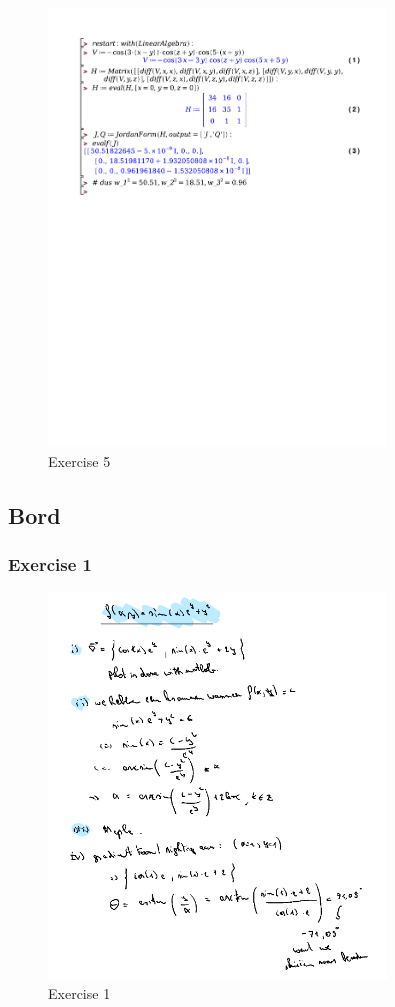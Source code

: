 \documentclass[a4paper]{report}
\begin{document}
\begin{figure}[H]
	\centering
	\includegraphics[width=0.8\textwidth]{exercises/huis_4_ex_5.pdf}
	\caption{Exercise 5}
	\label{fig:huis_4_ex_5}
\end{figure}

\subsection{Bord}

\subsubsection{Exercise 1}

\begin{figure}[H]
	\centering
	\includegraphics[width=0.8\textwidth]{assets/bord_4_ex_1.png}
	\caption{Exercise 1}
	\label{fig:bord_4_ex_1}
\end{figure}
\end{document}
